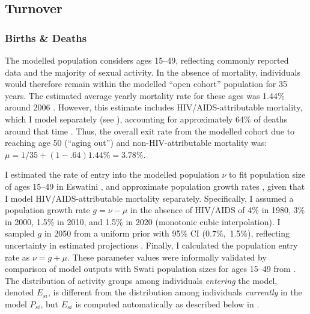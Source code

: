 \subsection{Turnover}\label{model.par.turn}
\subsubsection{Births \& Deaths}\label{model.par.turn.bd}
The modelled population considers ages 15--49,
reflecting commonly reported data and the majority of sexual activity.
In the absence of mortality, individuals would therefore
remain within the modelled ``open cohort'' population for 35 years.
The estimated average yearly mortality rate for these ages was 1.44\% around 2006
\cite[Table~15.2]{SDHS2006}.
However, this estimate includes HIV/AIDS-attributable mortality,
which I model separately (see ),
accounting for approximately 64\% of deaths around that time \cite{WHO2006esw}.
Thus, the overall exit rate from the modelled cohort
due to reaching age 50 (``aging out'') and non-HIV-attributable mortality was:
$\mu = 1/35 + (1-.64) 1.44\% = 3.78\%$.
\par
I estimated the rate of entry into the modelled population $\nu$
to fit population size of ages 15--49 in Eswatini \cite{WorldBank},
and approximate population growth rates \cite{UNWPP2019},
given that I model HIV/AIDS-attributable mortality separately.
Specifically, I assumed a population growth rate $g = \nu - \mu$ in the absence of HIV/AIDS of
4\% in 1980, 3\% in 2000, 1.5\% in 2010, and 1.5\% in 2020 (monotonic cubic interpolation).
I sampled $g$ in 2050 from a uniform prior with 95\% CI (0.7\%,~1.5\%),
reflecting uncertainty in estimated projections \cite{UNWPP2019}.
Finally, I calculated the population entry rate as $\nu = g + \mu$.
These parameter values were informally validated by comparison of model outputs with
Swati population sizes for ages 15--49 from \cite{WorldBank}.
The distribution of activity groups among individuals \emph{entering} the model, denoted $E_{si}$,
is different from the distribution among individuals \emph{currently} in the model $P_{si}$,
but $E_{si}$ is computed automatically as described below in .
